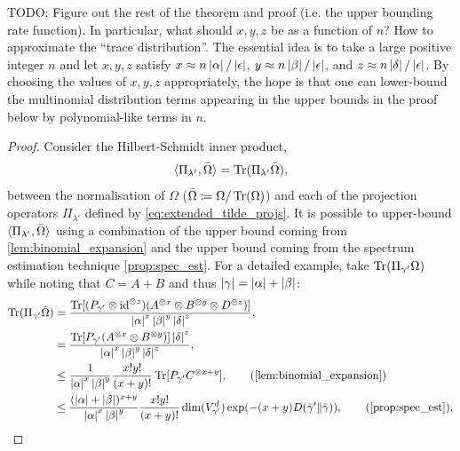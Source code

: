 \documentclass[notitlepage, 10pt]{article}
\begin{document}
{\color{red}
    TODO: Figure out the rest of the theorem and proof (i.e. the upper bounding rate function). In particular, what should $x,y,z$ be as a function of $n$? How to approximate the ``trace distribution''. The essential idea is to take a large positive integer $n$ and let $x,y,z$ satisfy $x \approx n \left|\alpha\right|/\left|\epsilon\right|$, $y \approx n \left|\beta\right|/\left|\epsilon\right|$, and $z \approx n \left|\delta\right|/\left|\epsilon\right|$. By choosing the values of $x,y,z$ appropriately, the hope is that one can lower-bound the multinomial distribution terms appearing in the upper bounds in the proof below by polynomial-like terms in $n$.
}
\begin{proof}
    Consider the Hilbert-Schmidt inner product, 
    \begin{equation}
        \braket{\Pi_{\lambda'}, \bar \Omega} = \operatorname{Tr}(\Pi_{\lambda'} \bar \Omega),
    \end{equation}
    between the normalisation of $\Omega$ ($\bar \Omega \coloneqq \Omega / \operatorname{Tr}(\Omega)$) and each of the projection operators $\Pi_{\lambda'}$ defined by \cref{eq:extended_tilde_projs}.
    It is possible to upper-bound $\braket{\Pi_{\lambda'}, \bar \Omega}$ using a combination of the upper bound coming from \cref{lem:binomial_expansion} and the upper bound coming from the spectrum estimation technique \cref{prop:spec_est}.
    For a detailed example, take $\operatorname{Tr}(\Pi_{\gamma'} \Omega)$ while noting that $C = A+B$ and thus $\left|\gamma\right| = \left|\alpha\right| + \left|\beta\right|$:
    \begin{align}
        \Tr(\Pi_{\gamma'} \bar \Omega)
        &= \frac{\Tr[(P_{\gamma'} \ot \id^{\ot z})(A^{\ot x}\ot B^{\ot y} \ot D^{\ot z})]}{\abs{\alpha}^{x}\abs{\beta}^{y}\abs{\delta}^{z}}, \\
        &= \frac{\Tr[P_{\gamma'}(A^{\ot x}\ot B^{\ot y})]\abs{\delta}^{z}}{\abs{\alpha}^{x}\abs{\beta}^{y}\abs{\delta}^{z}}, \\
        &\leq \frac{1}{\abs{\alpha}^{x}\abs{\beta}^{y}}\frac{x!y!}{(x+y)!}\Tr[P_{\gamma'}C^{\otimes x+y}], \qquad \text{(\cref{lem:binomial_expansion})} \\
        &\leq \frac{(\abs{\alpha}+\abs{\beta})^{x+y}}{\abs{\alpha}^{x}\abs{\beta}^{y}}\frac{x!y!}{(x+y)!}\dim(V_{\gamma'}^{d})\exp(-(x+y)\kl{\bar \gamma'}{\bar \gamma}), \qquad \text{(\cref{prop:spec_est})}.
    \end{align}


\end{proof}
\end{document}
